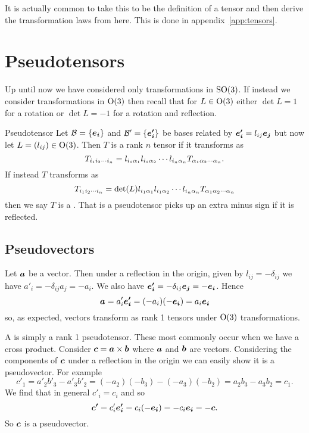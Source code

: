 It is actually common to take this to be the definition of a tensor and then derive the transformation laws from here.
This is done in appendix~\ref{app:tensors}.

\section{Pseudotensors}
Up until now we have considered only transformations in \(\mathrm{SO}(3)\).
If instead we consider transformations in \(\mathrm{O}(3)\) then recall that for \(L\in\mathrm{O}(3)\) either \(\det L = 1\) for a rotation or \(\det L = -1\) for a rotation and reflection.

\begin{definition}{Pseudotensor}{}
    Let \(\mathcal{B} = \{\bm{e_{i}}\}\) and \(\mathcal{B}' = \{\bm{e'_{i}}\}\) be bases related by \(\bm{e'_{i}} = l_{ij}\bm{e_{j}}\) but now let \(L = (l_{ij})\in\mathrm{O}(3)\).
    Then \(T\) is a rank \(n\) tensor if it transforms as
    \[T_{{ {i}_1 {i}_2 \dotsm {i}_{n} }} = l_{i_1\alpha_1}l_{i_1\alpha_2}\dotsm l_{i_n\alpha_n}T_{{ {\alpha}_1 {\alpha}_2 \dotsm {\alpha}_{n} }}.\]
    If instead \(T\) transforms as
    \[T_{{ {i}_1 {i}_2 \dotsm {i}_{n} }} = \det(L) l_{i_1\alpha_1}l_{i_1\alpha_2}\dotsm l_{i_n\alpha_n}T_{{ {\alpha}_1 {\alpha}_2 \dotsm {\alpha}_{n} }}\]
    then we say \(T\) is a .
    That is a pseudotensor picks up an extra minus sign if it is reflected.
\end{definition}

\subsection{Pseudovectors}
Let \(\bm{a}\) be a vector.
Then under a reflection in the origin, given by \(l_{ij} = -\delta_{ij}\) we have \(a'_i = -\delta_{ij}a_j = -a_i\).
We also have \(\bm{e'_i} = -\delta_{ij}\bm{e_{j}} = -\bm{e_{i}}\).
Hence
\[\bm{a} = a'_i\bm{e'_i} = (-a_i)(-\bm{e_{i}}) = a_i\bm{e_{i}}\]
so, as expected, vectors transform as rank 1 tensors under \(\mathrm{O}(3)\) transformations.

A  is simply a rank 1 pseudotensor.
These most commonly occur when we have a cross product.
Consider \(\bm{c} = \bm{a}\times\bm{b}\) where \(\bm{a}\) and \(\bm{b}\) are vectors.
Considering the components of \(\bm{c}\) under a reflection in the origin we can easily show it is a pseudovector.
For example
\[c'_1 = a'_2b'_3 - a'_3b'_2 = (-a_2)(-b_3) - (-a_3)(-b_2) = a_2b_3 - a_3b_2 = c_1.\]
We find that in general \(c'_i = c_i\) and so
\[\bm{c'} = c'_i\bm{e'_i} = c_i(-\bm{e_{i}}) = -c_i\bm{e_{i}} = -\bm{c}.\]
So \(\bm{c}\) is a pseudovector.

